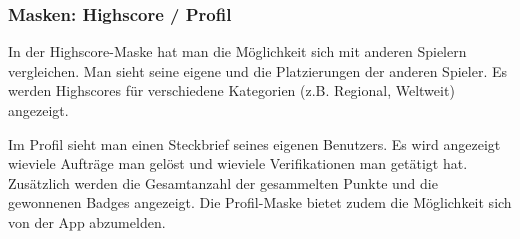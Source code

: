 \begin{figure}[H]
\hfill
{}
\end{figure}

\subsubsection{Masken: Highscore / Profil}
In der Highscore-Maske hat man die Möglichkeit sich mit anderen Spielern vergleichen.
Man sieht seine eigene und die Platzierungen der anderen Spieler.
Es werden Highscores für verschiedene Kategorien (z.B. Regional, Weltweit) angezeigt.

Im Profil sieht man einen Steckbrief seines eigenen Benutzers.
Es wird angezeigt wieviele Aufträge man gelöst und wieviele Verifikationen man getätigt hat.
Zusätzlich werden die Gesamtanzahl der gesammelten Punkte und die gewonnenen Badges angezeigt.
Die Profil-Maske bietet zudem die Möglichkeit sich von der App abzumelden.

